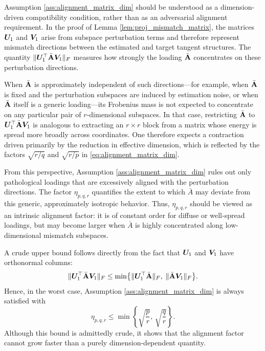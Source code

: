 \documentclass[authoryear,preprint,review,12pt]{elsarticle}
\begin{document}
		{
		\begin{remark}
			Assumption \ref{ass:alignment_matrix_dim} should be understood as a dimension-driven compatibility condition, rather than as an adversarial alignment requirement. In the proof of Lemma \ref{lem:proj_mismatch_matrix}, the matrices $\boldsymbol U_1$ and $\boldsymbol V_1$ arise from subspace perturbation terms and therefore represent mismatch directions between the estimated and target tangent structures. The quantity $\|\boldsymbol U_1^\top \bar {\mathbf{A}} \boldsymbol V_1\|_F$ measures how strongly the loading $\bar {\mathbf{A}}$ concentrates on these perturbation directions.
			
			When $\bar {\mathbf{A}}$ is approximately independent of such directions---for example, when $\bar {\mathbf{A}}$ is fixed and the perturbation subspaces are induced by estimation noise, or when $\bar {\mathbf{A}}$ itself is a generic loading---its Frobenius mass is not expected to concentrate on any particular pair of $r$-dimensional subspaces. In that case, restricting $\bar {\mathbf{A}}$ to $\boldsymbol U_1^\top \bar{\mathbf{A}} \boldsymbol V_1$ is analogous to extracting an $r\times r$ block from a matrix whose energy is spread more broadly across coordinates. One therefore expects a contraction driven primarily by the reduction in effective dimension, which is reflected by the factors $\sqrt{r/q}$ and $\sqrt{r/p}$ in \eqref{eq:alignment_matrix_dim}.
			
			From this perspective, Assumption \ref{ass:alignment_matrix_dim} rules out only pathological loadings that are excessively aligned with the perturbation directions. The factor $\eta_{p,q,r}$ quantifies the extent to which $\bar A$ may deviate from this generic, approximately isotropic behavior. Thus, $\eta_{p,q,r}$ should be viewed as an intrinsic alignment factor: it is of constant order for diffuse or well-spread loadings, but may become larger when $\bar A$ is highly concentrated along low-dimensional mismatch subspaces.
		\end{remark}
		
		\begin{remark}
			A crude upper bound follows directly from the fact that $\boldsymbol U_1$ and $\boldsymbol V_1$ have orthonormal columns:
			\[
			\|\boldsymbol U_1^\top \bar {\mathbf{A}} \boldsymbol V_1\|_F
			\le
			\min\bigl\{
			\|\boldsymbol U_1^\top \bar {\mathbf{A}}\|_F,\;
			\|\bar {\mathbf{A}} \boldsymbol V_1\|_F
			\bigr\}.
			\]
			Hence, in the worst case, Assumption \ref{ass:alignment_matrix_dim} is always satisfied with
			\[
			\eta_{p,q,r}\le \min\left\{\sqrt{\frac{p}{r}},\,\sqrt{\frac{q}{r}}\right\}.
			\]
			Although this bound is admittedly crude, it shows that the alignment factor cannot grow faster than a purely dimension-dependent quantity.
			

\end{remark}}
\end{document}
